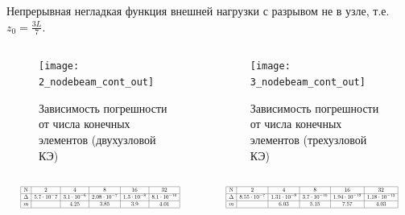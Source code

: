 \documentclass[7pt]{beamer}
\numberwithin{equation}{section}
\newcommand*{\Scale}[2][4]{\scalebox{#1}{$#2$}}
\begin{document}
\begin{frame}{}
	Непрерывная негладкая функция внешней нагрузки с разрывом не в узле, т.е.
	$z_{0}=\frac{3L}{7}.$ 
	
	
	\begin{columns}
		\begin{column}{0.57\textwidth}
			\begin{figure}[H]
				\centering
				\texttt{[image: 2\_nodebeam\_cont\_out]}
				\caption{Зависимость погрешности от числа конечных элементов (двухузловой КЭ)}
				\label{fig:2_nodebeam_cont_out}
			\end{figure}
		\end{column}
		\begin{column}{0.57\textwidth}
			\begin{figure}[H]
				\centering
				\texttt{[image: 3\_nodebeam\_cont\_out]}
				\caption{Зависимость погрешности от числа конечных элементов (трехузловой КЭ)}
				\label{fig:3_nodebeam_cont_out}
			\end{figure}
		\end{column}
	\end{columns}
	\begin{columns}
		\begin{column}{0.5\textwidth}
			\[
				\Scale[0.5] {
						\begin{array}{|c|c|c|c|c|c|}
								\hline
								\text{N} & 2 & 4 & 8 & 16 & 32 \\ \hline
								\Delta  & 5.7 \cdot 10^-7 & 3.1 \cdot 10^{-6} & 2.08 \cdot 10^{-7} & 1.3 \cdot 10^{-8} & 8.1 \cdot 10^{-10}\\ \hline
								m  &  &4.25 & 3.85 & 3.9 & 4.01 \\ 
								\hline
								\end{array}
				}
			\]
		\end{column}
		\begin{column}{0.5\textwidth}
			\[
					\Scale[0.5] {
			\begin{array}{|c|c|c|c|c|c|}
			\hline
			\text{N} & 2 & 4 & 8 & 16 & 32 \\ \hline
			\Delta  & 8.55 \cdot 10^{-7} & 1.31 \cdot 10^{-8} & 3.7 \cdot 10^{-10} & 1.94 \cdot 10^{-12} & 1.18 \cdot 10^{-13}  \\ \hline
			m  & & 6.03 & 5.15 & 7.57 & 4.03 \text{} \\ 
			\hline
			\end{array}
				}
				\]
		\end{column}
	\end{columns}
\end{frame}
\end{document}

